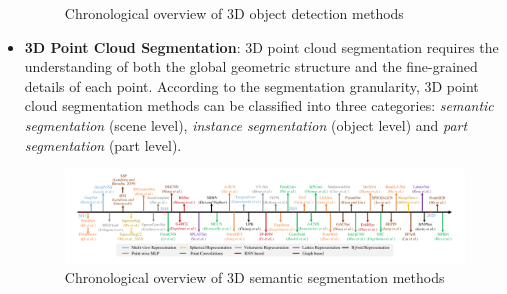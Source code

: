 \documentclass[11pt,a4paper]{article}
\begin{document}
\begin{itemize}
\begin{figure}[H]
        \caption{Chronological overview of 3D object detection methods}
    \end{figure}
    \item \textbf{3D Point Cloud Segmentation}: 3D point cloud segmentation requires the understanding of both the global geometric structure and the fine-grained details of each point. According to the segmentation granularity, 3D point cloud segmentation methods can be classified into three categories: \textit{semantic segmentation} (scene level), \textit{instance segmentation} (object level) and \textit{part segmentation} (part level).
    \begin{figure}[H]
        \centering
        \includegraphics[scale=0.7]{imgs/pointcloud-segmentation-methods.jpg}
        \caption{Chronological overview of 3D semantic segmentation methods}
    \end{figure}
\end{itemize}
\end{document}
